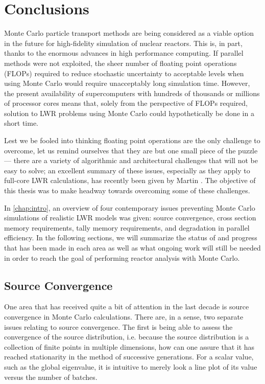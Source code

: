 \chapter{Conclusions}
\label{chap:conclusions}

Monte Carlo particle transport methods are being considered as a viable option
in the future for high-fidelity simulation of nuclear reactors. This is, in
part, thanks to the enormous advances in high performance computing. If parallel
methods were not exploited, the sheer number of floating point operations
(FLOPs) required to reduce stochastic uncertainty to acceptable levels when
using Monte Carlo would require unacceptably long simulation time. However, the
present availability of supercomputers with hundreds of thousands or millions of
processor cores means that, solely from the perspective of FLOPs required,
solution to LWR problems using Monte Carlo could hypothetically be done in a
short time.

Lest we be fooled into thinking floating point operations are the only challenge
to overcome, let us remind ourselves that they are but one small piece of the
puzzle --- there are a variety of algorithmic and architectural challenges that
will not be easy to solve; an excellent summary of these issues, especially as
they apply to full-core LWR calculations, has recently been given by Martin
\cite{net-martin-2012}. The objective of this thesis was to make headway towards
overcoming some of these challenges.

In \autoref{chap:intro}, an overview of four contemporary issues preventing
Monte Carlo simulations of realistic LWR models was given: source convergence,
cross section memory requirements, tally memory requirements, and degradation in
parallel efficiency. In the following sections, we will summarize the status of
and progress that has been made in each area as well as what ongoing work will
still be needed in order to reach the goal of performing reactor analysis with
Monte Carlo.

\section{Source Convergence}

One area that has received quite a bit of attention in the last decade is source
convergence in Monte Carlo calculations. There are, in a sense, two separate
issues relating to source convergence. The first is being able to assess the
convergence of the source distribution, i.e. because the source distribution is
a collection of finite points in multiple dimensions, how can one assure that it
has reached stationarity in the method of successive generations. For a scalar
value, such as the global eigenvalue, it is intuitive to merely look a line plot
of its value versus the number of batches.

